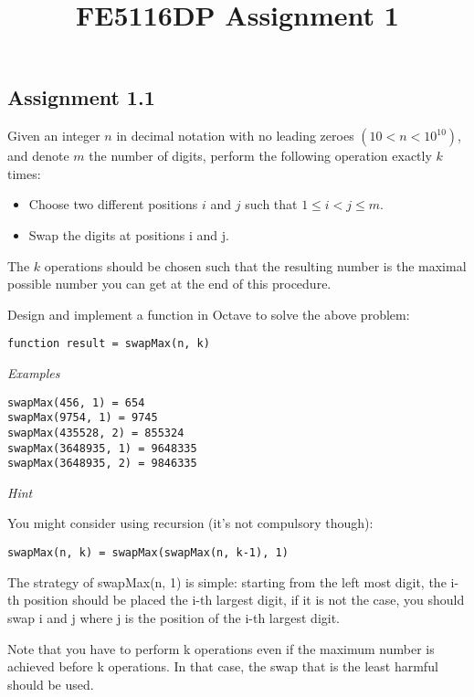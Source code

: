 \documentclass[11pt,a4paper,hidelinks,fleqn]{article}            %
\title{\vspace{-5ex}FE5116DP Assignment 1\vspace{-7ex}}
\date{}
\begin{document}
\maketitle
\subsection*{Assignment 1.1}
Given an integer $n$ in decimal notation with no leading zeroes $(10 < n < 10^{10})$,
and denote $m$ the number of digits,
perform the following operation exactly $k$ times: \vspace{-0.5cm}
\begin{itemize}
\item Choose two different positions $i$ and $j$ such that $1 \leq i < j \leq m$. 
\item Swap the digits at positions i and j. 
\end{itemize}
\vspace{-0.5cm}
The $k$ operations should be chosen such that the resulting number is the maximal possible number you can get at the end of this procedure. 

Design and implement a function in Octave to solve the above problem:
\begin{verbatim}
function result = swapMax(n, k)
\end{verbatim}

\emph{Examples} \vspace{-0.9cm}
\begin{verbatim}
swapMax(456, 1) = 654
swapMax(9754, 1) = 9745
swapMax(435528, 2) = 855324
swapMax(3648935, 1) = 9648335
swapMax(3648935, 2) = 9846335
\end{verbatim}

\emph{Hint}

You might consider using recursion (it's not compulsory though):  \vspace{-0.9cm}
\begin{verbatim}
swapMax(n, k) = swapMax(swapMax(n, k-1), 1)
\end{verbatim}
The strategy of swapMax(n, 1) is simple: starting from the left most digit, 
the i-th position should be placed the i-th largest digit, 
if it is not the case, you should swap i and j where j is the position of the i-th largest digit.

Note that you have to perform k operations even if the maximum number is achieved before k operations.
In that case, the swap that is the least harmful should be used.
\end{document}
